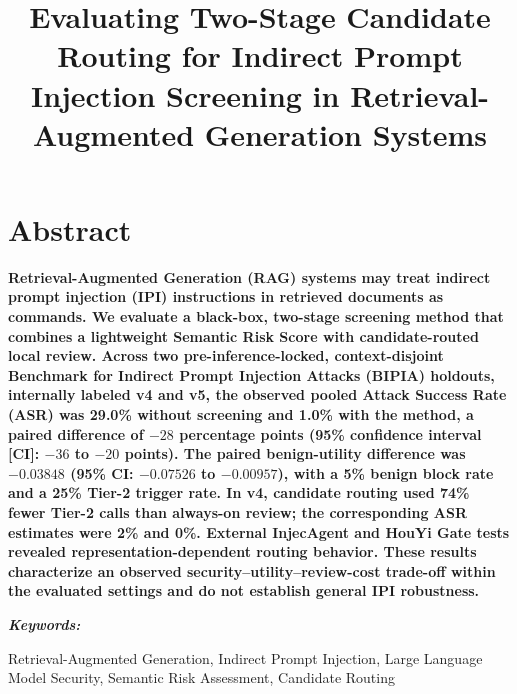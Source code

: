 \documentclass[conference,a4paper]{IEEEtran}
\begin{document}
\title{\fontsize{16}{19.2}\selectfont\bfseries Evaluating Two-Stage Candidate Routing for Indirect Prompt Injection Screening in Retrieval-Augmented Generation Systems}

\author{
}

\maketitle

\section*{Abstract}
{\fontsize{9}{10.8}\selectfont\bfseries
Retrieval-Augmented Generation (RAG) systems may treat indirect prompt injection (IPI) instructions in retrieved documents as commands. We evaluate a black-box, two-stage screening method that combines a lightweight Semantic Risk Score with candidate-routed local review. Across two pre-inference-locked, context-disjoint Benchmark for Indirect Prompt Injection Attacks (BIPIA) holdouts, internally labeled v4 and v5, the observed pooled Attack Success Rate (ASR) was 29.0\% without screening and 1.0\% with the method, a paired difference of $-28$ percentage points (95\% confidence interval [CI]: $-36$ to $-20$ points). The paired benign-utility difference was $-0.03848$ (95\% CI: $-0.07526$ to $-0.00957$), with a 5\% benign block rate and a 25\% Tier-2 trigger rate. In v4, candidate routing used 74\% fewer Tier-2 calls than always-on review; the corresponding ASR estimates were 2\% and 0\%. External InjecAgent and HouYi Gate tests revealed representation-dependent routing behavior. These results characterize an observed security--utility--review-cost trade-off within the evaluated settings and do not establish general IPI robustness.\par}

{\noindent\fontsize{10}{12}\selectfont\bfseries\itshape Keywords: }
{\fontsize{9}{10.8}\selectfont Retrieval-Augmented Generation, Indirect Prompt Injection, Large Language Model Security, Semantic Risk Assessment, Candidate Routing\par}
\end{document}
